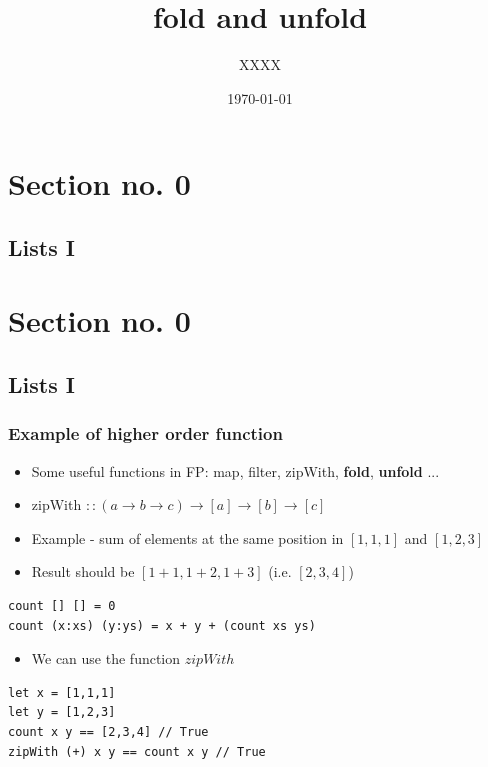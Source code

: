 \documentclass[10pt]{beamer}
\begin{document}
\title{fold and unfold}   
\author{XXXX}  
\date{\today} 

\frame{\titlepage} 


\section{Section no. 0} 
\subsection{Lists I}


\section{Section no. 0} 
\subsection{Lists I}
\begin{frame}[fragile]
\frametitle{Example of higher order function}
\begin{itemize}
\item Some useful functions in FP: map, filter, zipWith, \textbf{fold}, \textbf{unfold} ...
\item zipWith $:: (a \rightarrow b \rightarrow c) \rightarrow [a] \rightarrow [b] \rightarrow [c]$
\item Example - sum of elements at the same position in $[1,1,1]$ and $[1,2,3]$
\item Result should be $[1+1, 1+2,1+3]$ (i.e. $[2,3,4]$) 
\end{itemize}

\begin{lstlisting}
count [] [] = 0
count (x:xs) (y:ys) = x + y + (count xs ys) 

\end{lstlisting}


\begin{itemize}
\item We can use the function $zipWith$ 
\end{itemize}
\begin{lstlisting}
let x = [1,1,1] 
let y = [1,2,3] 
count x y == [2,3,4] // True	
zipWith (+) x y == count x y // True 	

\end{lstlisting}
\end{frame}
\end{document}
